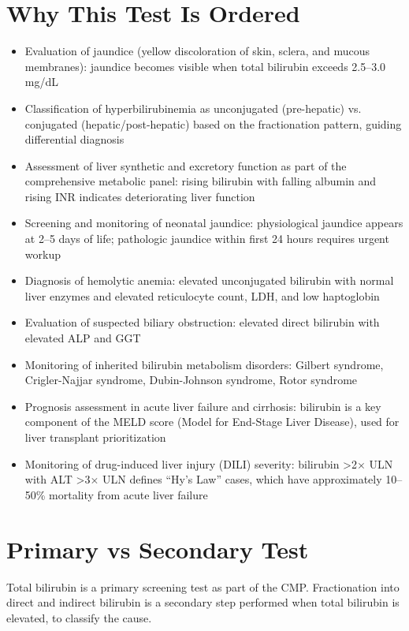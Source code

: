 \section*{Why This Test Is Ordered}
\begin{itemize}
  \item Evaluation of jaundice (yellow discoloration of skin, sclera, and mucous membranes): jaundice becomes visible when total bilirubin exceeds 2.5--3.0 mg/dL
  \item Classification of hyperbilirubinemia as unconjugated (pre-hepatic) vs. conjugated (hepatic/post-hepatic) based on the fractionation pattern, guiding differential diagnosis
  \item Assessment of liver synthetic and excretory function as part of the comprehensive metabolic panel: rising bilirubin with falling albumin and rising INR indicates deteriorating liver function
  \item Screening and monitoring of neonatal jaundice: physiological jaundice appears at 2--5 days of life; pathologic jaundice within first 24 hours requires urgent workup
  \item Diagnosis of hemolytic anemia: elevated unconjugated bilirubin with normal liver enzymes and elevated reticulocyte count, LDH, and low haptoglobin
  \item Evaluation of suspected biliary obstruction: elevated direct bilirubin with elevated ALP and GGT
  \item Monitoring of inherited bilirubin metabolism disorders: Gilbert syndrome, Crigler-Najjar syndrome, Dubin-Johnson syndrome, Rotor syndrome
  \item Prognosis assessment in acute liver failure and cirrhosis: bilirubin is a key component of the MELD score (Model for End-Stage Liver Disease), used for liver transplant prioritization
  \item Monitoring of drug-induced liver injury (DILI) severity: bilirubin >2$\times$ ULN with ALT >3$\times$ ULN defines ``Hy's Law'' cases, which have approximately 10--50\% mortality from acute liver failure
\end{itemize}

\section*{Primary vs Secondary Test}
Total bilirubin is a primary screening test as part of the CMP. Fractionation into direct and indirect bilirubin is a secondary step performed when total bilirubin is elevated, to classify the cause.

